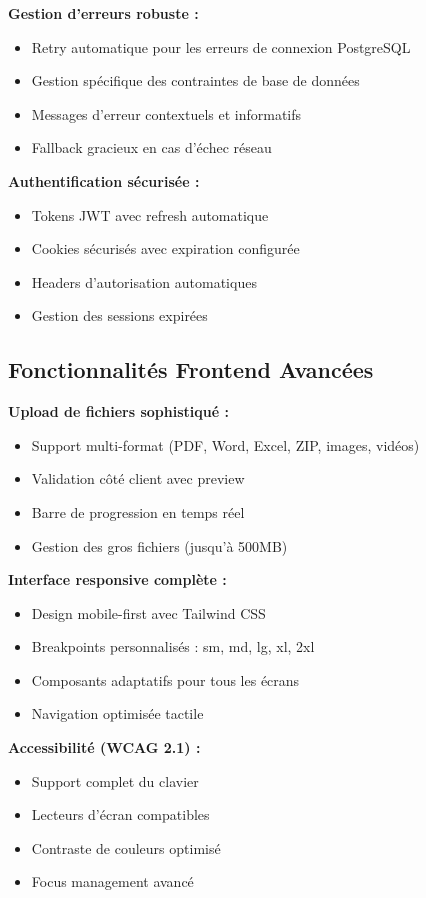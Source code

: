 \documentclass[12pt,a4paper]{article}
\begin{document}
\textbf{Gestion d'erreurs robuste :}
\begin{itemize}
    \item Retry automatique pour les erreurs de connexion PostgreSQL
    \item Gestion spécifique des contraintes de base de données
    \item Messages d'erreur contextuels et informatifs
    \item Fallback gracieux en cas d'échec réseau
\end{itemize}

\textbf{Authentification sécurisée :}
\begin{itemize}
    \item Tokens JWT avec refresh automatique
    \item Cookies sécurisés avec expiration configurée
    \item Headers d'autorisation automatiques
    \item Gestion des sessions expirées
\end{itemize}

\subsection{Fonctionnalités Frontend Avancées}

\textbf{Upload de fichiers sophistiqué :}
\begin{itemize}
    \item Support multi-format (PDF, Word, Excel, ZIP, images, vidéos)
    \item Validation côté client avec preview
    \item Barre de progression en temps réel
    \item Gestion des gros fichiers (jusqu'à 500MB)
\end{itemize}

\textbf{Interface responsive complète :}
\begin{itemize}
    \item Design mobile-first avec Tailwind CSS
    \item Breakpoints personnalisés : sm, md, lg, xl, 2xl
    \item Composants adaptatifs pour tous les écrans
    \item Navigation optimisée tactile
\end{itemize}

\textbf{Accessibilité (WCAG 2.1) :}
\begin{itemize}
    \item Support complet du clavier
    \item Lecteurs d'écran compatibles
    \item Contraste de couleurs optimisé
    \item Focus management avancé
\end{itemize}
\end{document}
